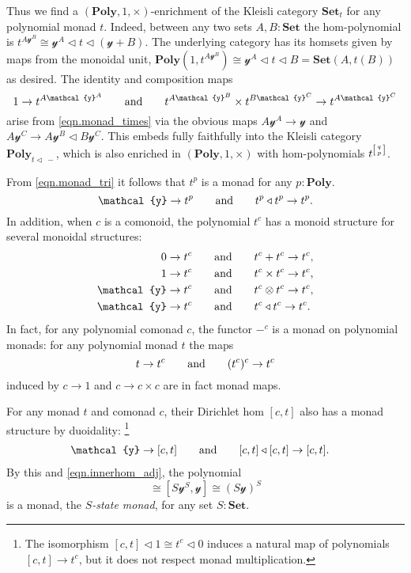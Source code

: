 \documentclass[11pt, one side, article]{memoir}
\makeatletter
\theoremstyle{definition}
\theoremstyle{plain}
\newcommand{\Cat}[1]{\mathbf{#1}}%
\newcommand{\tn}[1]{\textnormal{#1}}
\newcommand{\smset}{\Cat{Set}}
\newcommand{\yon}{{\mathcal{y}}}
\newcommand{\poly}{\Cat{Poly}}
\newcommand{\0}{\textsf{0}}
\newcommand{\1}{\tn{\textsf{1}}}
\newcommand{\tri}{\mathbin{\triangleleft}}
\newcommand{\biglens}[2]{
     \begin{bmatrix}{\vphantom{f_f^f}#2} \\ {\vphantom{f_f^f}#1} \end{bmatrix}
}
\newcommand{\littlelens}[2]{
     \begin{bsmallmatrix}{\vphantom{f}#2} \\ {\vphantom{f}#1} \end{bsmallmatrix}
}
\newcommand{\lens}[2]{
  \relax\if@display
     \biglens{#1}{#2}
  \else
     \littlelens{#1}{#2}
  \fi
}
\newcommand{\hh}[2][]{#1 \tn{#2} #1}
\newcommand{\qqand}{\hh[\qquad]{and}}
\makeatother
\begin{document}
Thus we find a $(\poly,1,\times)$-enrichment of the Kleisli category $\smset_t$ for any polynomial monad $t$. Indeed, between any two sets $A,B:\smset$ the hom-polynomial is $t^{A\yon^B}\cong \yon^A\tri t\tri(\yon+B)$. The underlying category has its homsets given by maps from the monoidal unit, $\poly(1,t^{A\yon^B})\cong\yon^A\tri t\tri B=\smset(A,t(B))$ as desired. The identity and composition maps
\begin{equation}
	1\to t^{A\yon^A}
	\qqand
	t^{A\yon^B}\times t^{B\yon^C}\to t^{A\yon^C}
\end{equation}
arise from \eqref{eqn.monad_times} via the obvious maps $A\yon^A\to\yon$ and $A\yon^C\to A\yon^B\tri B\yon^C$. This embeds fully faithfully into the Kleisli category $\poly_{t\tri\,-}$, which is also enriched in $(\poly,1,\times)$ with hom-polynomials $t^{\tiny\lens{p}{q}}$.

From \eqref{eqn.monad_tri} it follows that $t^p$ is a monad for any $p:\poly$. 
\begin{equation}\label{eqn.t^p_monad}
	\yon\to t^p\qqand t^p\tri t^p\to t^p.
\end{equation}
In addition, when $c$ is a comonoid, the polynomial $t^c$ has a monoid structure for several monoidal structures:
\begin{align}
  0\to t^c &\qqand t^c + t^c\to t^c,\\
  \label{eqn.t^c_times_monoid}
  1\to t^c &\qqand t^c\times t^c\to t^c,\\
  \yon\to t^c &\qqand t^c\otimes t^c\to t^c,\\\label{eqn.monad_comonad_power}
  \yon\to t^c &\qqand t^c\tri t^c\to t^c.
\end{align}
In fact, for any polynomial comonad $c$, the functor $-^c$ is a monad on polynomial monads: for any polynomial monad $t$ the maps
\begin{equation}
	t\to t^c
	\qqand
	(t^c)^c\to t^c
\end{equation}
induced by $c\to 1$ and $c\to c\times c$ are in fact monad maps.

For any monad $t$ and comonad $c$, their Dirichlet hom $[c,t]$ also has a monad structure by duoidality:%
\footnote{The isomorphism $[c,t]\tri 1\cong t^c\tri 0$ induces a natural map of polynomials $[c,t]\to t^c$, but it does not respect monad multiplication.}
\begin{align}
	\yon\to[c,t]
	&\qqand
	[c,t]\tri[c,t]\to[c,t].
\end{align}
By this and \eqref{eqn.innerhom_adj}, the polynomial
\begin{equation}
	[S\yon,S\yon]\cong [S\yon^S,\yon]\cong (S\yon)^S
\end{equation}
is a monad, the \emph{$S$-state monad}, for any set $S:\smset$.
\end{document}
